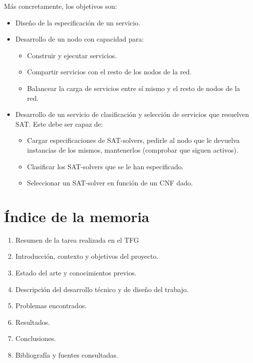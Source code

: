 \documentclass[11pt]{article}
\begin{document}
		Más concretamente, los objetivos son:
		\begin{itemize}
			\item Diseño de la especificación de un servicio.
			\item Desarrollo de un nodo con capacidad para:
			\begin{itemize}
				\item Construir y ejecutar servicios.
				\item Compartir servicios con el resto de los nodos de la red.
				\item Balancear la carga de servicios entre sí mismo y el resto de nodos de la red.
			\end{itemize}
			\item Desarrollo de un servicio de clasificación y selección de servicios que 
			resuelven SAT. Este debe ser capaz de:
			\begin{itemize}
				\item Cargar especificaciones de SAT-solvers, pedirle al nodo que le devuelva
				 instancias de los mismos, mantenerlos (comprobar que siguen activos).
				\item Clasificar los SAT-solvers que se le han especificado.
				\item Seleccionar un SAT-solver en función de un CNF dado.
			\end{itemize}
		\end{itemize}

	\section{Índice de la memoria}
		\begin{enumerate}
			\item Resumen de la tarea realizada en el TFG
			\item Introducción, contexto y objetivos del proyecto.
			\item Estado del arte y conocimientos previos.
			\item Descripción del desarrollo técnico y de diseño del trabajo.
			\item Problemas encontrados.
			\item Resultados.
			\item Conclusiones.
			\item Bibliografía y fuentes consultadas.
		\end{enumerate}
\end{document}

